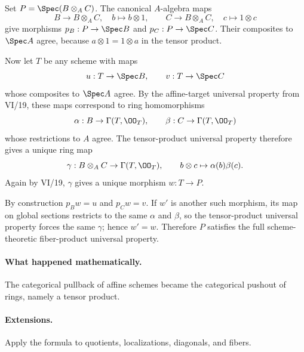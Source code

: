 \begin{solution}
Set $P=\Spec(B\otimes_AC)$.  The canonical $A$-algebra maps
\[
B\to B\otimes_AC,\quad b\mapsto b\otimes1,
\qquad
C\to B\otimes_AC,\quad c\mapsto1\otimes c
\]
give morphisms $p_B:P\to\Spec B$ and $p_C:P\to\Spec C$.  Their composites to $\Spec A$ agree,
because $a\otimes1=1\otimes a$ in the tensor product.

Now let $T$ be any scheme with maps
\[
u:T\to\Spec B,\qquad v:T\to\Spec C
\]
whose composites to $\Spec A$ agree.  By the affine-target universal property from VI/19, these
maps correspond to ring homomorphisms
\[
\alpha:B\to\Gamma(T,\OO_T),\qquad
\beta:C\to\Gamma(T,\OO_T)
\]
whose restrictions to $A$ agree.  The tensor-product universal property therefore gives a unique
ring map
\[
\gamma:B\otimes_AC\to\Gamma(T,\OO_T),
\qquad
b\otimes c\mapsto\alpha(b)\beta(c).
\]
Again by VI/19, $\gamma$ gives a unique morphism $w:T\to P$.

By construction $p_Bw=u$ and $p_Cw=v$.  If $w'$ is another such morphism, its map on global
sections restricts to the same $\alpha$ and $\beta$, so the tensor-product universal property
forces the same $\gamma$; hence $w'=w$.  Therefore $P$ satisfies the full scheme-theoretic
fiber-product universal property.
\end{solution}

\paragraph{What happened mathematically.}
The categorical pullback of affine schemes became the categorical pushout of rings, namely a tensor product.

\paragraph{Extensions.}
Apply the formula to quotients, localizations, diagonals, and fibers.
\fi

